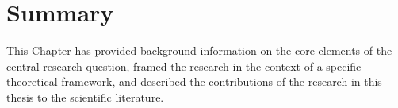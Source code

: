 \documentclass[a4paper,nobind]{templates/ociamthesis}
\newcommand*{\bibtitle}{References}
\begin{document}
\hypertarget{summary}{%
\section{Summary}\label{summary}}

This Chapter has provided background information on the core elements of the central research question, framed the research in the context of a specific theoretical framework, and described the contributions of the research in this thesis to the scientific literature.




\setlength{\baselineskip}{0pt} %

{\renewcommand*\MakeUppercase[1]{#1}%
\printbibliography[heading=bibintoc,title={\bibtitle}]}
\end{document}
